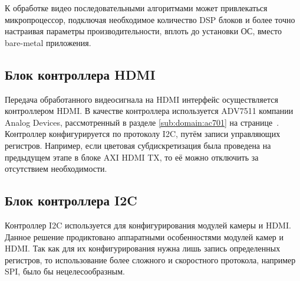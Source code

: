 К обработке видео последовательными алгоритмами может привлекаться микропроцессор, подключая необходимое количество DSP блоков
и более точно настраивая параметры производительности, вплоть до установки ОС, вместо bare-metal приложения.

\subsection{Блок контроллера HDMI}
\label{sec:structural:hdmi_controller}
Передача обработанного видеосигнала на HDMI интерфейс осуществляется контроллером HDMI.
В качестве контроллера используется ADV7511 компании Analog Devices, рассмотренный в разделе
\ref{sub:domain:ac701} на странице~\pageref{fig:domain:ac701:hdmi}. Контроллер конфигурируется
по протоколу I2C, путём записи управляющих регистров. Например, если цветовая субдискретизация была
проведена на предыдущем этапе в блоке AXI HDMI TX, то её можно отключить за отсутствием необходимости.

\subsection{Блок контроллера I2C}
\label{sec:structural:i2c}
Контроллер I2C используется для конфигурирования модулей камеры и HDMI. Данное решение продиктовано
аппаратными особенностями модулей камер и HDMI. Так как для их конфигурирования нужна лишь запись определенных регистров,
то использование более сложного и скоростного протокола, например SPI, было бы нецелесообразным.
